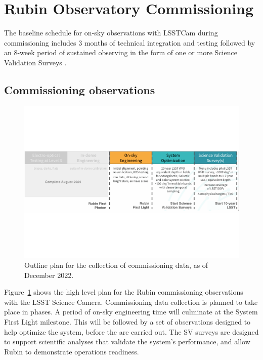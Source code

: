 \section{Rubin Observatory Commissioning}
\label{sec:commissioning}

The baseline schedule for on-sky observations with LSSTCam during commissioning includes 3 months of technical integration and testing followed by an 8-week period of sustained observing in the form of one or more Science Validation Surveys \citep{SCTN-007}.

\subsection{Commissioning observations}

\begin{figure}
\includegraphics[width=\linewidth]{figures/commissioning-plan}
\caption{Outline plan for the collection of commissioning data, as of December 2022.}
\label{fig:commissioning}
\end{figure}

Figure~\ref{fig:commissioning} shows the high level plan for the Rubin commissioning observations with the LSST Science Camera.
Commissioning data collection is planned to take place in phases.
A period of on-sky engineering time will culminate at the System First Light milestone.
This will be followed by a set of observations designed to help optimize the system, before the \svs are carried out.
The SV surveys are designed to support scientific analyses that validate the system's performance, and allow Rubin to demonstrate operations readiness.


